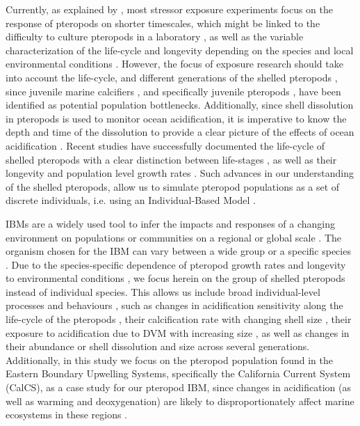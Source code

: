 Currently, as explained by \citet{Manno2017ReviewPteropodVulnerability}, most stressor exposure experiments focus on the response of pteropods on shorter timescales, which might be linked to the difficulty to culture pteropods in a laboratory \citep{Howes2014Lab}, as well as the variable characterization of the life-cycle and longevity depending on the species and local environmental conditions \citep{Bednarsek2012PteropodDistribution,Manno2017ReviewPteropodVulnerability}. However, the focus of exposure research should take into account the life-cycle, and different generations of the shelled pteropods \citep{Manno2017ReviewPteropodVulnerability}, since juvenile marine calcifiers \citep{Kroeker2013JuvenilesCalcifiers}, and specifically juvenile pteropods \citep{Bednarsek2016CumulativeEffects}, have been identified as potential population bottlenecks. Additionally, since shell dissolution in pteropods is used to monitor ocean acidification, it is imperative to know the depth and time of the dissolution to provide a clear picture of the effects of ocean acidification \citep{Johnson2016}.  Recent studies have successfully documented the life-cycle of shelled pteropods with a clear distinction between life-stages \citep{Howes2014Lab,Thabet2015Lifestages}, as well as their longevity and population level growth rates \citep{Wang2017Lifecycle}. Such advances in our understanding of the shelled pteropods, allow us to simulate pteropod populations as a set of discrete individuals, i.e. using an Individual-Based Model \citep[IBM; ][]{DeAngelis2014IBM}. 


IBMs are a widely used tool to infer the impacts and responses of a changing environment on populations or communities on a regional or global scale \citep{DeAngelis2014IBM}. The organism chosen for the IBM can vary between a wide group \citep[e.g. phytoplankton; ][]{Clark2011IBMAdaptations} or a specific species \citep[e.g. Calanus finmarchicus, three-spined stickleback; ][]{Miller1998CalanusIBM,Mintram2018IBM_Stickleback}. Due to the species-specific dependence of pteropod growth rates and longevity to environmental conditions  \citep[e.g. temperature, food availability; ][]{Wang2017Lifecycle}, we focus herein on the group of shelled pteropods instead of individual species. This allows us include broad individual-level processes and behaviours \citep{DeAngelis2014IBM}, such as changes in acidification sensitivity along the life-cycle of the pteropods \citep{Bednarsek2016CumulativeEffects}, their calcification rate with changing shell size \citep{Bednarsek2014CalcificationDissolution}, their exposure to acidification due to DVM with increasing size \citep{Maas2012DVM,Bednarsek2015VerticalDistribution}, as well as changes in their abundance or shell dissolution and size across several generations. Additionally, in this study we focus on the pteropod population found in the Eastern Boundary Upwelling Systems, specifically the California Current System (CalCS), as a case study for our pteropod IBM, since changes in acidification (as well as warming and deoxygenation) are likely to disproportionately affect marine ecosystems in these regions \citep{Gruber2011TripleWhammy}. 

